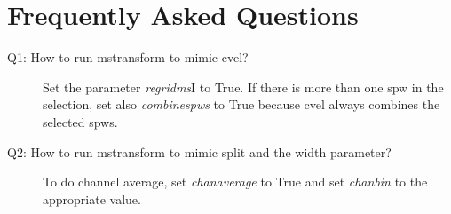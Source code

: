 \begin{enumerate}
\end{enumerate}

\section{Frequently Asked Questions}\label{Sec:FAQ}
\begin{description}
  \item[Q1: How to run mstransform to mimic cvel?] \hfill 
  Set the parameter {\it regridms}I to True. If there is more than one spw in the
selection, set also {\it combinespws} to True because cvel always combines the selected
spws.

  \item[Q2: How to run mstransform to mimic split and the width parameter?] \hfill 
  To do channel average, set {\it chanaverage} to True and set {\it chanbin} to the
  appropriate value.

\end{description}

